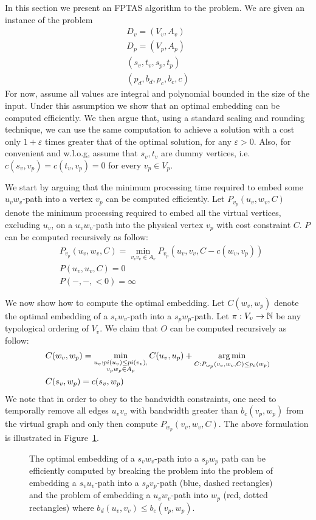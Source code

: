 In this section we present an FPTAS algorithm to the \VPN{} problem.
We are given an instance of the \VPN{} problem 
\begin{align*}
D_v = (V_v, A_v)		\\
D_p = (V_p, A_p)		\\
(s_v, t_v, s_p, t_p)	\\
(p_d, b_d, p_c, b_c, c)
\end{align*}
For now, assume all values are integral and polynomial bounded in the size of
the input.
Under this assumption we show that an optimal embedding can be computed
efficiently.
We then argue that, using a standard scaling and rounding technique, we can use
the same computation to achieve a solution with a cost only
$1 + \varepsilon$ times greater that of the optimal solution, for any
$\varepsilon > 0$.
Also, for convenient and w.l.o.g, assume that $s_v, t_v$ are dummy vertices, 
i.e. $c(s_v, v_p) = c(t_v, v_p) = 0$ for every $v_p \in V_p$.

We start by arguing that the minimum processing time required to embed some
$u_vw_v$-path into a vertex $v_p$ can be computed efficiently.
Let $P_{v_p}(u_v, w_v, C)$ denote the minimum processing required to embed
all the virtual vertices, excluding $u_v$, on a $u_vw_v$-path into the physical
vertex $v_p$ with cost constraint $C$.
$P$ can be computed recursively as follow:
\begin{align*}
&P_{v_p}(u_v, w_v, C) = 
\min_{v_vv_v \in A_v} P_{v_p}(u_v, v_v, C - c(w_v, v_p))
\\
&P(u_v, u_v, C) = 0
\\
&P(-, -, <0) = \infty
\end{align*}
 
We now show how to compute the optimal embedding.
Let $C(w_v, w_p)$ denote the
optimal embedding of a $s_vw_v$-path into a $s_pw_p$-path.
Let $\pi:V_v \to \mathbb{N}$ be any typological ordering of $V_v$. 
We claim that $O$ can be computed recursively as follow:
\begin{align*}
&C(w_v, w_p) = 
\min_{\substack{
u_v : pi(u_v) \leq pi(v_v), 
\\
v_pw_p \in A_p
}}
C(u_v, u_p)
+
\operatorname*{arg\,min}_{C : P_{w_p}(v_v, w_v, C) \leq p_c(w_p)}
\\
&C(s_v, w_p) = c(s_v, w_p)
\end{align*}
We note that in order to obey to the bandwidth constraints, 
one need to temporally remove all edges $u_vv_v$ with bandwidth greater than
$b_c(v_p, w_p)$ from the virtual graph and only then compute $P_{w_p}(v_v, w_v,
C)$.
The above formulation is illustrated in Figure~\ref{fig:dp1}.

\begin{figure}[ht]
\centering

\caption[]{
\label{fig:dp1}
The optimal embedding of a $s_vw_v$-path into a $s_pw_p$ path can be efficiently 
computed by breaking the problem into the problem of embedding a $s_vu_v$-path
into a $s_pv_p$-path (blue, dashed rectangles) 
and the problem of embedding a $u_vw_v$-path into $w_p$ (red, dotted
rectangles) where $b_d(u_v, v_v) \leq b_c(v_p, w_p)$.
}
\end{figure}
